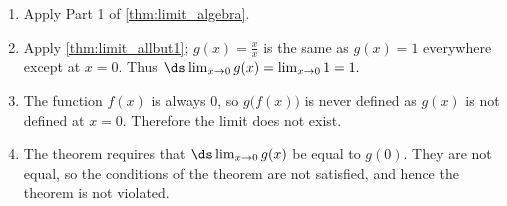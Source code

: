 {\begin{enumerate}
	\item Apply Part 1 of \autoref{thm:limit_algebra}.
	\item	Apply \autoref{thm:limit_allbut1}; $g(x) = \frac xx$ is the same as $g(x) = 1$ everywhere except at $x=0$. Thus $\ds\lim_{x\to0} g(x) = \lim_{x\to 0} 1 = 1.$
	\item	The function $f(x)$ is always 0, so $g\big(f(x)\big)$ is never defined as $g(x)$ is not defined at $x=0$. Therefore the limit does not exist.
	\item	The theorem requires that $\ds\lim_{x\to0} g(x)$ be equal to $g(0)$. They are not equal, so the conditions of the theorem are not satisfied, and hence the theorem is not violated.
\end{enumerate}}


